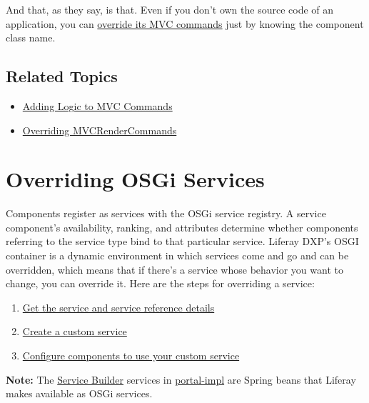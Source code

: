And that, as they say, is that. Even if you don't own the source code of
an application, you can
\href{/docs/7-2/customization/-/knowledge_base/c/overriding-liferay-mvc-commands}{override
its MVC commands} just by knowing the component class name.

\section{Related Topics}\label{related-topics-30}

\begin{itemize}
\tightlist
\item
  \href{/docs/7-2/customization/-/knowledge_base/c/adding-logic-to-mvc-commands}{Adding
  Logic to MVC Commands}
\item
  \href{/docs/7-2/customization/-/knowledge_base/c/overriding-mvcrendercommand}{Overriding
  MVCRenderCommands}
\end{itemize}

\chapter{Overriding OSGi Services}\label{overriding-osgi-services}

Components register as services with the OSGi service registry. A
service component's availability, ranking, and attributes determine
whether components referring to the service type bind to that particular
service. Liferay DXP's OSGI container is a dynamic environment in which
services come and go and can be overridden, which means that if there's
a service whose behavior you want to change, you can override it. Here
are the steps for overriding a service:

\begin{enumerate}
\def\labelenumi{\arabic{enumi}.}
\item
  \href{/docs/7-2/customization/-/knowledge_base/c/examining-an-osgi-service-to-override}{Get
  the service and service reference details}
\item
  \href{/docs/7-2/customization/-/knowledge_base/c/creating-a-custom-osgi-service}{Create
  a custom service}
\item
  \href{/docs/7-2/customization/-/knowledge_base/c/reconfiguring-components-to-use-your-service}{Configure
  components to use your custom service}
\end{enumerate}

\noindent\hrulefill

\textbf{Note:} The
\href{/docs/7-2/appdev/-/knowledge_base/a/service-builder}{Service
Builder} services in
\href{https://docs.liferay.com/dxp/portal/7.2-latest/javadocs/portal-impl/}{portal-impl}
are Spring beans that Liferay makes available as OSGi services.


